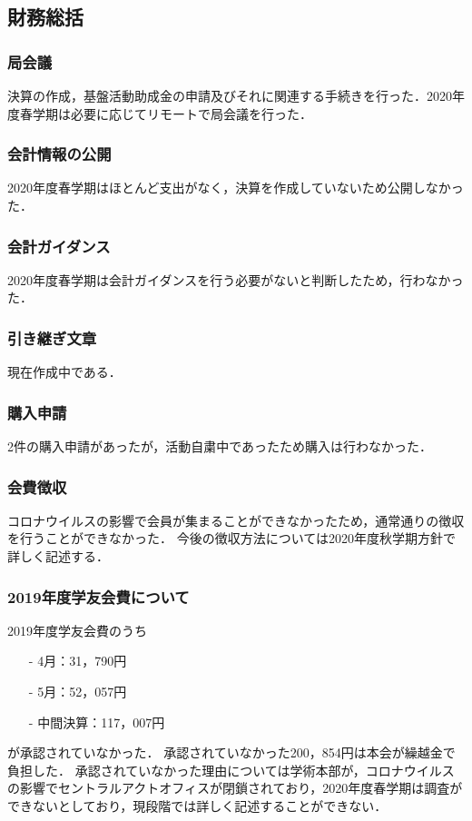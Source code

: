 \subsection*{財務総括}


\subsubsection*{局会議}
決算の作成，基盤活動助成金の申請及びそれに関連する手続きを行った．2020年度春学期は必要に応じてリモートで局会議を行った．

\subsubsection*{会計情報の公開}
2020年度春学期はほとんど支出がなく，決算を作成していないため公開しなかった．

\subsubsection*{会計ガイダンス}
2020年度春学期は会計ガイダンスを行う必要がないと判断したため，行わなかった．

\subsubsection*{引き継ぎ文章}
現在作成中である．

\subsubsection*{購入申請}
2件の購入申請があったが，活動自粛中であったため購入は行わなかった．

\subsubsection*{会費徴収}
コロナウイルスの影響で会員が集まることができなかったため，通常通りの徴収を行うことができなかった．
今後の徴収方法については2020年度秋学期方針で詳しく記述する．

\subsubsection*{2019年度学友会費について}
2019年度学友会費のうち
\begin{itemize}
	\item[-]4月：31，790円
	\item[-]5月：52，057円
	\item[-]中間決算：117，007円
\end{itemize}
が承認されていなかった．
承認されていなかった200，854円は本会が繰越金で負担した．
承認されていなかった理由については学術本部が，コロナウイルスの影響でセントラルアクトオフィスが閉鎖されており，2020年度春学期は調査ができないとしており，現段階では詳しく記述することができない．


